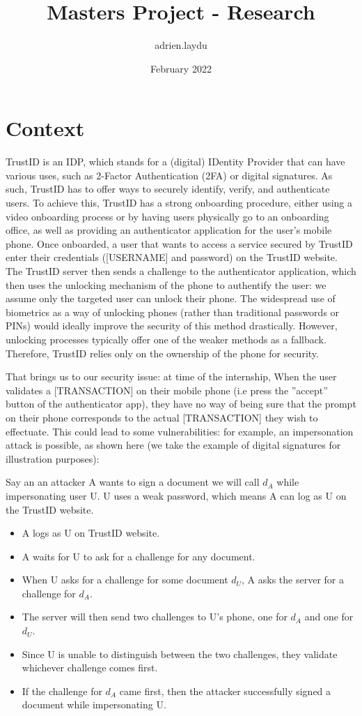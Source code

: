 \documentclass{article}
\title{Masters Project - Research}
\author{adrien.laydu}
\date{February 2022}
\begin{document}
\section{Context}

TrustID is an IDP, which stands for a (digital) IDentity Provider that can have various uses, such as 2-Factor Authentication (2FA) or digital signatures. As such, TrustID has to offer ways to securely identify, verify, and authenticate users. To achieve this, TrustID has a strong onboarding procedure, either using a video onboarding process or by having users physically go to an onboarding office, as well as providing an authenticator application for the user's mobile phone. Once onboarded, a user that wants to access a service secured by TrustID enter their credentials ([USERNAME] and password) on the TrustID website. The TrustID server then sends a challenge to the authenticator application, which then uses the unlocking mechanism of the phone to authentify the user: we assume only the targeted user can unlock their phone. The widespread use of biometrics as a way of unlocking phones (rather than traditional passwords or PINs) would ideally improve the security of this method drastically. However, unlocking processes typically offer one of the weaker methods as a fallback. Therefore, TrustID relies only on the ownership of the phone for security.

\vspace{4pt}
That brings us to our security issue: at time of the internship, When the user validates a [TRANSACTION] on their mobile phone (i.e press the ”accept” button of the authenticator app), they have no way of being sure that the prompt on their phone corresponds to the actual [TRANSACTION] they wish to effectuate. This could lead to some vulnerabilities: for example, an impersonation attack is possible, as shown here (we take the example of digital signatures for illustration purposes):

Say an an attacker A wants to sign a document we will call $d_A$ while impersonating user U. U uses a weak password, which means A can log as U on the TrustID website.
\begin{itemize}
    \item A logs as U on TrustID website.
    \item A waits for U to ask for a challenge for any document.
    \item When U asks for a challenge for some document $d_U$, A asks the server for a challenge for $d_A$.
    \item The server will then send two challenges to U’s phone, one for $d_A$ and one for $d_U$.
    \item Since U is unable to distinguish between the two challenges, they validate whichever challenge comes first.
    \item If the challenge for $d_A$ came first, then the attacker successfully signed a document while impersonating U.
\end{itemize}
\end{document}
